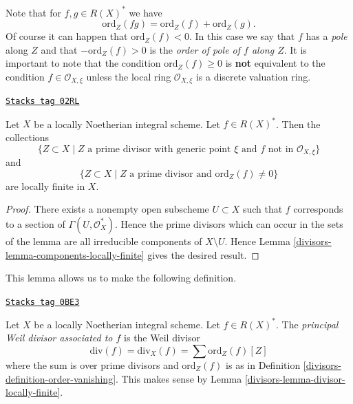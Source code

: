 Note that for $f, g \in R(X)^*$ we have
$$
\text{ord}_Z(fg) = \text{ord}_Z(f) + \text{ord}_Z(g).
$$
Of course it can happen that $\text{ord}_Z(f) < 0$.
In this case we say that $f$ has a {\it pole} along $Z$
and that $-\text{ord}_Z(f) > 0$ is the
{\it order of pole of $f$ along $Z$}. It is important to note
that the condition $\text{ord}_Z(f) \geq 0$ is {\bf not} equivalent
to the condition $f \in \mathcal{O}_{X, \xi}$ unless the local
ring $\mathcal{O}_{X, \xi}$ is a discrete valuation ring.

\begin{lemma}
\label{divisors-lemma-divisor-locally-finite}
\href{https://stacks.math.columbia.edu/tag/02RL}{\texttt{Stacks tag 02RL}}

Let $X$ be a locally Noetherian integral scheme. Let $f \in R(X)^*$.
Then the collections
$$
\{Z \subset X \mid Z\text{ a prime divisor with generic point }\xi
\text{ and }f\text{ not in }\mathcal{O}_{X, \xi}\}
$$
and
$$
\{Z \subset X \mid Z \text{ a prime divisor and }\text{ord}_Z(f) \not = 0\}
$$
are locally finite in $X$.
\end{lemma}

\begin{proof}

There exists a nonempty open subscheme $U \subset X$ such that $f$
corresponds to a section of $\Gamma(U, \mathcal{O}_X^*)$. Hence the
prime divisors which can occur in the sets of the lemma are all
irreducible components of $X \setminus U$.
Hence Lemma \ref{divisors-lemma-components-locally-finite} gives the desired result.
\end{proof}

This lemma allows us to make the following definition.

\begin{definition}
\label{divisors-definition-principal-divisor}
\href{https://stacks.math.columbia.edu/tag/0BE3}{\texttt{Stacks tag 0BE3}}

Let $X$ be a locally Noetherian integral scheme. Let $f \in R(X)^*$.
The {\it principal Weil divisor associated to $f$} is the Weil divisor
$$
\text{div}(f) = \text{div}_X(f) = \sum \text{ord}_Z(f) [Z]
$$
where the sum is over prime divisors and $\text{ord}_Z(f)$ is as in
Definition \ref{divisors-definition-order-vanishing}. This makes sense
by Lemma \ref{divisors-lemma-divisor-locally-finite}.
\end{definition}

